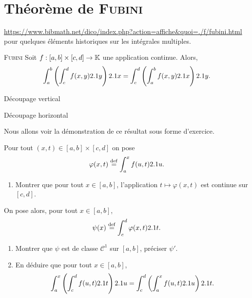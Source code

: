 \section{Théorème de \textsc{Fubini}}

\url{https://www.bibmath.net/dico/index.php?action=affiche&quoi=./f/fubini.html} pour quelques éléments historiques sur les intégrales multiples. 

\begin{theo}{\textsc{Fubini}}
    Soit $f: [a,b] \times [c, d] \to \mathbb{K}$ une application continue. Alors,
    $$\int_{a}^{b} \left ( \int_{c}^{d} f(x,y) 2.1 y \right) 2.1 x = \int_{c}^{d} \left ( \int_{a}^{b} f(x,y) 2.1 x \right) 2.1 y.$$
\end{theo}

\begin{marginfigure}[0cm]
    \centering
    
    \caption{Découpage vertical}
\end{marginfigure}
\begin{marginfigure}[5cm]
    \centering
    
    \caption{Découpage horizontal}
\end{marginfigure}

Nous allons voir la démonstration de ce résultat sous forme d'exercice.

\begin{exercice}
    Pour tout $(x, t) \in [a, b] \times [c, d]$ on pose 
    $$\varphi(x, t) \overset{\mathrm{\tiny def}}{=} \int_{a}^{x} f(u, t) 2.1 u.$$
    \begin{enumerate}
    \item Montrer que pour tout $x \in [a, b]$, l'application $t \mapsto \varphi(x, t)$ est continue sur $[c, d]$.
    \end{enumerate}

    On pose alors, pour tout $x  \in [a, b]$,
    $$\psi(x) \overset{\mathrm{\tiny def}}{=} \int_{c}^{d} \varphi(x, t) 2.1 t.$$
    \begin{enumerate}[resume]
        \item Montrer que $\psi$ est de classe $\mathscr{C}^1$ sur $[a, b]$, préciser $\psi'$.
        \item En déduire que pour tout $x \in [a, b]$,
        $$\int_{a}^{x} \left( \int_{c}^{d} f(u,t) 2.1 t \right) 2.1 u = \int_{c}^{d} \left( \int_{a}^{x} f(u,t) 2.1 u \right) 2.1 t.$$
    \end{enumerate}
\end{exercice}


